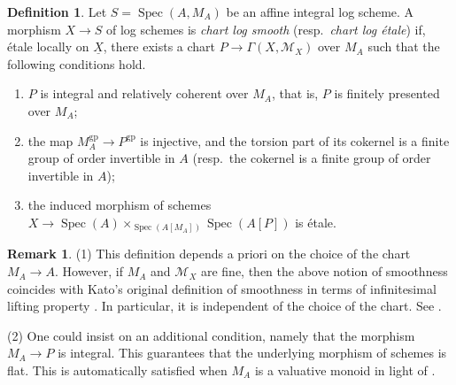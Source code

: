 \documentclass[11pt, a4paper]{amsart}
\theoremstyle{definition}
\newtheorem{df}[thm]{Definition}
\newtheorem{rmk}[thm]{Remark}
\numberwithin{equation}{subsection}
\providecommand{\Spec}[1]{\operatorname{Spec}(#1)} 	%
\newcommand{\gp}{{\mathrm{gp}}}
\begin{document}
\begin{df}\label{def:chart_logsmooth}
    Let $S=\Spec{A,M_A}$ be an affine integral log scheme. A morphism $X\to S$ of log schemes is \emph{chart log smooth} (resp.\ \emph{chart log \'etale}) if, \'etale locally on $\underline{X}$, there exists a chart $P \to \Gamma(X, \mathcal{M}_X)$ over $M_A$ such that the following conditions hold.
    \begin{enumerate}
        \item $P$ is integral and relatively coherent over $M_A$, that is, $P$ is finitely presented over $M_A$;
        \item the map $M_A^\gp \to P^\gp$ is injective, and the torsion part of its cokernel is a finite group of order invertible in $A$ (resp.\ the cokernel is a finite group of order invertible in $A$);
        \item the induced morphism of schemes $X\to \Spec{A} \times_{\Spec{A[M_A]}} \Spec{A[P]}$ is \'etale.
    \end{enumerate}
\end{df}
\begin{rmk}
   (1) This definition depends a priori on the choice of the chart $M_A\to A$. However, if $M_A$ and $\mathcal{M}_X$ are fine, then the above notion of smoothness coincides with Kato's original definition of smoothness in terms of infinitesimal lifting property \cite[\S 3.3]{KatoLog}.  In particular, it is independent of the choice of the chart. See \cite[Remark A.13]{Koshikawa}.

    (2) One could insist on an additional condition, namely that the morphism $M_A\to P$ is integral. This guarantees that the underlying morphism of schemes is flat. This is automatically satisfied when $M_A$ is a valuative monoid in light of \cite[Proposition I.4.6.3(5)]{Ogu}. 
    \end{rmk}
\end{document}

